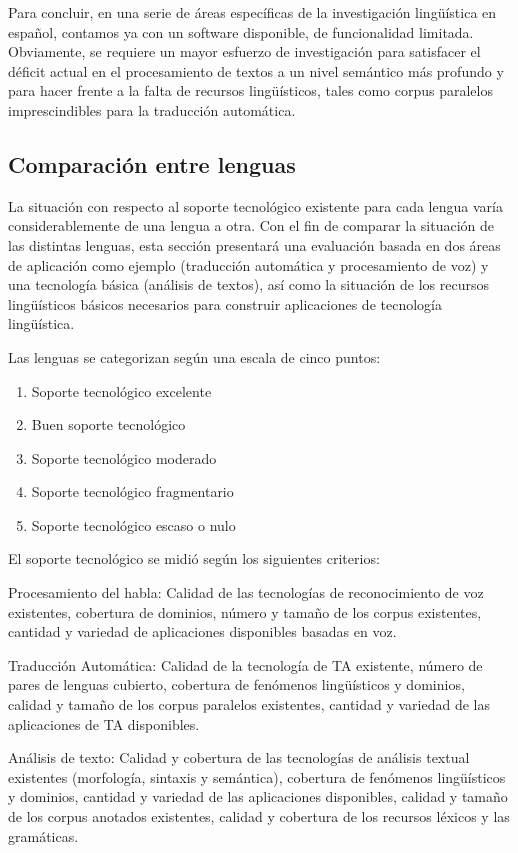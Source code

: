 \begin{multicols}{2}
Para concluir, en una serie de áreas específicas de la investigación lingüística en español, contamos ya con un software disponible, de funcionalidad limitada. Obviamente, se requiere un mayor esfuerzo de investigación para satisfacer el déficit actual en el  procesamiento de textos a un nivel semántico más profundo y para hacer frente a la falta de recursos lingüísticos, tales como corpus paralelos imprescindibles para la traducción automática.

\subsection{Comparación entre lenguas}

La situación con respecto al soporte tecnológico existente para cada lengua varía considerablemente de una lengua a otra. Con el fin de comparar la situación de las distintas lenguas, esta sección presentará una evaluación basada en dos áreas de aplicación como ejemplo (traducción automática y procesamiento de voz) y una tecnología básica (análisis de textos), así como la situación de los recursos lingüísticos básicos necesarios para construir aplicaciones de tecnología lingüística.

Las lenguas se categorizan según una escala de cinco puntos:
\begin{enumerate}
  \item Soporte tecnológico excelente
  \item Buen soporte tecnológico
  \item Soporte tecnológico moderado
  \item Soporte tecnológico fragmentario
  \item Soporte tecnológico escaso o nulo
\end{enumerate}

El soporte tecnológico se midió según los siguientes criterios:

Procesamiento del habla: Calidad de las tecnologías de reconocimiento de voz existentes, cobertura de dominios, número y tamaño de los corpus existentes, cantidad y variedad de aplicaciones disponibles basadas en voz.

Traducción Automática: Calidad de la tecnología de TA existente, número de pares de lenguas cubierto, cobertura de fenómenos lingüísticos y dominios, calidad y tamaño de los corpus paralelos existentes, cantidad y variedad de las aplicaciones de TA disponibles.

Análisis de texto: Calidad y cobertura de las tecnologías de análisis textual existentes (morfología, sintaxis y semántica), cobertura de fenómenos lingüísticos y dominios, cantidad y variedad de las aplicaciones disponibles, calidad y tamaño de los corpus anotados existentes, calidad y cobertura de los recursos léxicos y las gramáticas.


\end{multicols}
